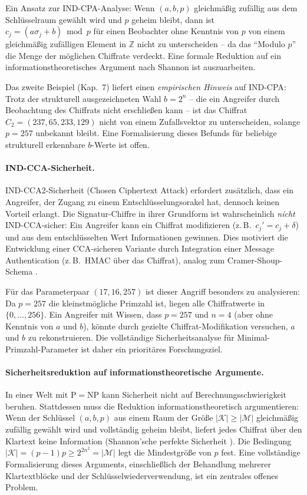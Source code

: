 ﻿\documentclass[a4paper,12pt]{scrreprt}
\theoremstyle{definition}
\begin{document}
Ein Ansatz zur IND-CPA-Analyse: Wenn $(a, b, p)$ gleichmäßig zufällig aus dem Schlüsselraum gewählt wird und $p$ geheim bleibt, dann ist $c_j = (a\sigma_j + b) \bmod p$ für einen Beobachter ohne Kenntnis von $p$ von einem gleichmäßig zufälligen Element in $\mathbb{Z}$ nicht zu unterscheiden -- da das ``Modulo $p$'' die Menge der möglichen Chiffrate verdeckt. Eine formale Reduktion auf ein informationstheoretisches Argument nach Shannon \cite{Sha49} ist auszuarbeiten.

Das zweite Beispiel (Kap.~7) liefert einen \emph{empirischen Hinweis} auf IND-CPA: Trotz der strukturell ausgezeichneten Wahl $b = 2^n$ -- die ein Angreifer durch Beobachtung des Chiffrats nicht erschließen kann -- ist das Chiffrat $C_2 = (237, 65, 233, 129)$ nicht von einem Zufallsvektor zu unterscheiden, solange $p = 257$ unbekannt bleibt. Eine Formalisierung dieses Befunds für beliebige strukturell erkennbare $b$-Werte ist offen.

\paragraph{IND-CCA-Sicherheit.}
IND-CCA2-Sicherheit (Chosen Ciphertext Attack) \cite{RS91} erfordert zusätzlich, dass ein Angreifer, der Zugang zu einem Entschlüsselungsorakel hat, dennoch keinen Vorteil erlangt. Die Signatur-Chiffre in ihrer Grundform ist wahrscheinlich \emph{nicht} IND-CCA-sicher: Ein Angreifer kann ein Chiffrat modifizieren (z.\,B.\ $c_j' = c_j + \delta$) und aus dem entschlüsselten Wert Informationen gewinnen. Dies motiviert die Entwicklung einer CCA-sicheren Variante durch Integration einer Message Authentication (z.\,B.\ HMAC über das Chiffrat), analog zum Cramer-Shoup-Schema \cite{ElG85}.

Für das Parameterpaar $(17, 16, 257)$ ist dieser Angriff besonders zu analysieren: Da $p = 257$ die kleinstmögliche Primzahl ist, liegen alle Chiffratwerte in $\{0, \ldots, 256\}$. Ein Angreifer mit Wissen, dass $p = 257$ und $n = 4$ (aber ohne Kenntnis von $a$ und $b$), könnte durch gezielte Chiffrat-Modifikation versuchen, $a$ und $b$ zu rekonstruieren. Die vollständige Sicherheitsanalyse für Minimal-Primzahl-Parameter ist daher ein prioritäres Forschungsziel.

\paragraph{Sicherheitsreduktion auf informationstheoretische Argumente.}
In einer Welt mit $\mathrm{P}=\mathrm{NP}$ \cite{Epp26a} kann Sicherheit nicht auf Berechnungsschwierigkeit beruhen. Stattdessen muss die Reduktion informationstheoretisch argumentieren: Wenn der Schlüssel $(a,b,p)$ aus einem Raum der Größe $|\mathcal{K}| \geq |\mathcal{M}|$ gleichmäßig zufällig gewählt wird und vollständig geheim bleibt, liefert jedes Chiffrat über den Klartext keine Information (Shannon'sche perfekte Sicherheit \cite{Sha49}). Die Bedingung $|\mathcal{K}| = (p-1)p \geq 2^{2n^2} = |\mathcal{M}|$ legt die Mindestgröße von $p$ fest. Eine vollständige Formalisierung dieses Arguments, einschließlich der Behandlung mehrerer Klartextblöcke und der Schlüsselwiederverwendung, ist ein zentrales offenes Problem.
\end{document}

